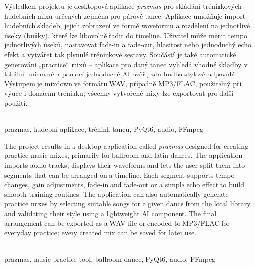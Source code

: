 \documentclass[12pt, a4paper,
]{report}
\begin{document}
\noindent
Výsledkem projektu je desktopová aplikace \textit{prazmas} pro skládání tréninkových hudebních mixů určených zejména pro párové tance. Aplikace umožňuje import hudebních skladeb, jejich zobrazení ve formě waveformu a rozdělení na jednotlivé úseky (buňky), které lze libovolně řadit do timeline. Uživatel může měnit tempo jednotlivých úseků, nastavovat fade-in a fade-out, hlasitost nebo jednoduchý echo efekt a vytvářet tak plynulé tréninkové sestavy. Součástí je také automatické generování „practice“ mixů – aplikace pro daný tanec vyhledá vhodné skladby v lokální knihovně a pomocí jednoduché AI ověří, zda hudba stylově odpovídá. Výstupem je mixdown ve formátu WAV, případně MP3/FLAC, použitelný při výuce i domácím tréninku; všechny vytvořené mixy lze exportovat pro další použití.

\vspace{18pt}
\\
\noindent prazmas, hudební aplikace, trénink tanců, PyQt6, audio, FFmpeg

\vspace{18pt}

\noindent
The project results in a desktop application called \textit{prazmas} designed for creating practice music mixes, primarily for ballroom and latin dances. The application imports audio tracks, displays their waveforms and lets the user split them into segments that can be arranged on a timeline. Each segment supports tempo changes, gain adjustments, fade-in and fade-out or a simple echo effect to build smooth training routines. The application can also automatically generate practice mixes by selecting suitable songs for a given dance from the local library and validating their style using a lightweight AI component. The final arrangement can be exported as a WAV file or encoded to MP3/FLAC for everyday practice; every created mix can be saved for later use.

\vspace{18pt}
\\
\noindent prazmas, music practice tool, ballroom dance, PyQt6, audio, FFmpeg

\clearpage


\tableofcontents
{}
\pagestyle{plain}
\setcounter{page}{4}
\end{document}
